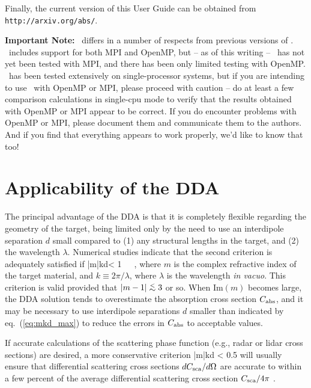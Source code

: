 Finally, the current version of this 
User Guide can be obtained from\newline
{\tt http://arxiv.org/abs/\arxivnum}.

\medskip

{\bf Important Note:} \ddscatseventhree\ differs in a number of respects
from previous versions of \ddscat.  \ddscatseventhree\
includes support for both MPI and OpenMP, but -- as of this writing --
\ddscatseventhree\ has not yet been tested with MPI, and there has
been only limited testing with OpenMP.
\ddscatseventhree\ has been tested extensively on
single-processor systems, but if you are intending to use \ddscatseventhree\
with OpenMP or MPI, please proceed with caution -- 
do at least a few comparison calculations in
single-cpu mode to verify that the results obtained with OpenMP or MPI appear to
be correct.  If you do encounter problems with OpenMP or MPI, please document
them and communicate them to the authors.  And if you find that everything
appears to work properly, we'd like to know that too!

\section{Applicability of the DDA\label{sec:applicability}}
The principal advantage of the DDA is that it is completely flexible 
regarding the geometry of the target, being limited only by the need to 
use an interdipole separation $d$ small compared to 
(1) any structural lengths in the target, and
(2) the wavelength $\lambda$.
Numerical studies \citep{Draine+Goodman_1993,Draine+Flatau_1994,Draine_2000a}
indicate that the second criterion is adequately satisfied if
\beq
|m|kd< 1~~~,
\label{eq:mkd_max}
\eeq
where $m$ is the complex refractive index of the target
material, and $k\equiv2\pi/\lambda$, where $\lambda$ is the wavelength
{\it in vacuo}.
This criterion is valid provided that $|m-1| \ltsim 3$ or so.
When Im$(m)$ becomes large, the DDA solution tends to overestimate
the absorption cross section $C_{\rm abs}$, and it may be necessary to use
interdipole separations $d$ smaller than indicated by eq.\ (\ref{eq:mkd_max})
to reduce the errors in $C_{\rm abs}$ to acceptable values.

If accurate calculations of the scattering phase function
(e.g., radar or lidar cross sections)
are desired,
a more conservative criterion 
\beq
|m|kd < 0.5
\eeq
will usually ensure that differential scattering cross sections
$dC_{\rm sca}/d\Omega$ are accurate to within a few percent of the
average differential scattering cross section $C_{\rm sca}/4\pi$
\citep[see][]{Draine_2000a}.

